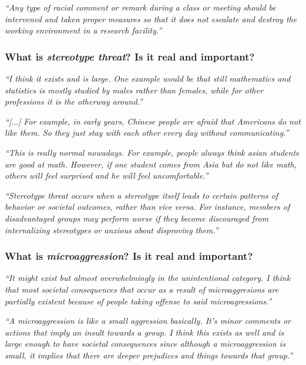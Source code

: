 \documentclass[12pt]{beamer}
\newcommand\ans[1]{{\it ``#1''}}
\newcommand\gap{\vspace{5mm}}
\begin{document}
\begin{frame}

  \ans{Any type of racial comment or remark during a class or meeting should be intervened and taken proper measures so that it does not escalate and destroy the working environment in a research facility.}
  
  \end{frame}

\begin{frame} %

  \frametitle{What is {\em stereotype threat}? Is it real and important?}

  \ans{I think it exists and is large.  One example would be that still mathematics and statistics is mostly studied by males rather than females, while for other professions it is the otherway around.}

  \gap
  
  \ans{[$\dots$] For example, in early years, Chinese people are afraid that Americans do not like them.  So they just stay with each other every day without communicating.}

  \gap
  
\ans{This is really normal nowadays.  For example, people always think asian students are good at math.  However, if one student comes from Asia but do not like math, others will feel surprised and he will feel uncomfortable.}
  
\end{frame}


\begin{frame}
  
  \ans{Stereotype threat occurs when a stereotype itself leads to certain patterns of behavior or societal outcomes, rather than vice versa.  For instance, members of disadvantaged groups may perform worse if they become discouraged from internalizing stereotypes or anxious about disproving them.}
  
\end{frame}

\begin{frame}   %

  \frametitle{What is {\em microaggression}? Is it real and important?}

  \ans{It might exist but almost overwhelmingly in the unintentional category.  I think that most societal consequences that occur as a result of microaggresions are partially existent because of people taking offense to said microagressions.}

  \gap
  
  \ans{A microaggression is like a small aggression basically.  It's minor comments or actions that imply an insult towards a group.  I think this exists as well and is large enough to have societal consequences since although a microaggression is small, it implies that there are deeper prejudices and things towards that group.}
  
\end{frame}
\end{document}
